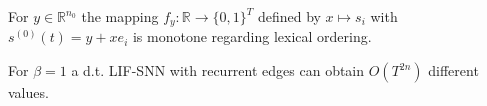 \begin{lemma}
  For \(y∈ℝ^{n_0}\) the mapping \(f_y:ℝ→\{0,1\}^T\) defined by \(x↦s_i\) with \(s^{(0)}(t)=y+xe_i\) is monotone regarding lexical ordering.
\end{lemma}

\begin{theorem}
For \(β=1\) a d.t. LIF-SNN with recurrent edges can obtain \(O(T^{2n})\) different values.
\end{theorem}

\cleardoublepage
